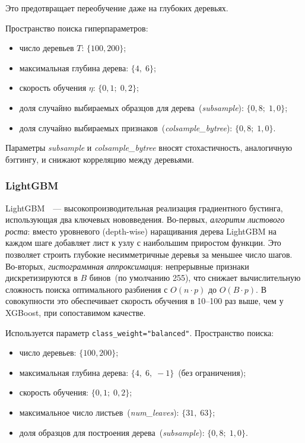 Это предотвращает переобучение даже на глубоких деревьях.

Пространство поиска гиперпараметров:
\begin{itemize}
    \item число деревьев $T$: $\{100, 200\}$;
    \item максимальная глубина дерева: $\{4,\; 6\}$;
    \item скорость обучения $\eta$: $\{0{,}1;\; 0{,}2\}$;
    \item доля случайно выбираемых образцов для дерева~(\textit{subsample}): $\{0{,}8;\; 1{,}0\}$;
    \item доля случайно выбираемых признаков~(\textit{colsample\_bytree}): $\{0{,}8;\; 1{,}0\}$.
\end{itemize}

Параметры \textit{subsample} и \textit{colsample\_bytree} вносят стохастичность, аналогичную бэггингу, и снижают корреляцию между деревьями.

\subsubsection{LightGBM}

LightGBM~\cite{lightgbm_paper}~--- высокопроизводительная реализация градиентного бустинга, использующая два ключевых нововведения. Во-первых, \textit{алгоритм листового роста}: вместо уровневого (depth-wise) наращивания дерева LightGBM на каждом шаге добавляет лист к узлу с наибольшим приростом функции. Это позволяет строить глубокие несимметричные деревья за меньшее число шагов. Во-вторых, \textit{гистограммная аппроксимация}: непрерывные признаки дискретизируются в $B$ бинов~(по умолчанию 255), что снижает вычислительную сложность поиска оптимального разбиения с $O(n \cdot p)$ до $O(B \cdot p)$. В совокупности это обеспечивает скорость обучения в 10--100 раз выше, чем у XGBoost, при сопоставимом качестве.

Используется параметр \texttt{class\_weight="balanced"}. Пространство поиска:
\begin{itemize}
    \item число деревьев: $\{100, 200\}$;
    \item максимальная глубина дерева: $\{4,\; 6,\; -1\}$~(без ограничения);
    \item скорость обучения: $\{0{,}1;\; 0{,}2\}$;
    \item максимальное число листьев~(\textit{num\_leaves}): $\{31,\; 63\}$;
    \item доля образцов для построения дерева~(\textit{subsample}): $\{0{,}8;\; 1{,}0\}$.
\end{itemize}

